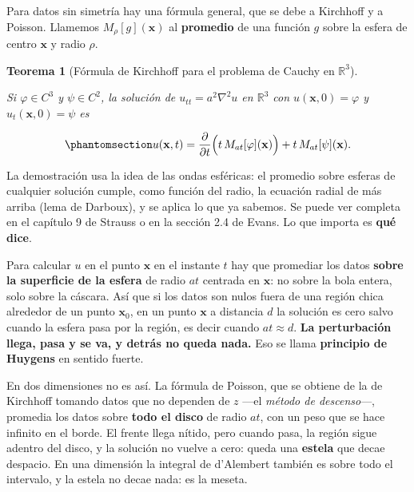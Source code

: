 \documentclass[
  spanish,
  a4paper,
]{scrbook}
\theoremstyle{definition}
\theoremstyle{plain}
\theoremstyle{definition}
\theoremstyle{plain}
\newtheorem{theorem}{Teorema}[chapter]
\theoremstyle{definition}
\theoremstyle{remark}
\begin{document}
Para datos sin simetría hay una fórmula general, que se debe a Kirchhoff
y a Poisson. Llamemos \(M_\rho[g](\mathbf x)\) al \textbf{promedio} de
una función \(g\) sobre la esfera de centro \(\mathbf x\) y radio
\(\rho\).

\begin{theorem}[Fórmula de Kirchhoff para el problema de Cauchy en
\(\mathbb R^3\)]\protect\hypertarget{thm-hip-kirchhoff-cauchy}{}\label{thm-hip-kirchhoff-cauchy}

Si \(\varphi\in C^3\) y \(\psi\in C^2\), la solución de
\(u_{tt} = a^2\nabla^2u\) en \(\mathbb R^3\) con
\(u(\mathbf x,0) = \varphi\) y \(u_t(\mathbf x,0) = \psi\) es

\begin{equation}\protect\phantomsection\label{eq-hip-kirchhoff-cauchy}{
u(\mathbf x,t) = \frac{\partial}{\partial t}\Big(t\,M_{at}[\varphi](\mathbf x)\Big) + t\,M_{at}[\psi](\mathbf x).
}\end{equation}

\end{theorem}

La demostración usa la idea de las ondas esféricas: el promedio sobre
esferas de cualquier solución cumple, como función del radio, la
ecuación radial de más arriba (lema de Darboux), y se aplica lo que ya
sabemos. Se puede ver completa en el capítulo 9 de Strauss o en la
sección 2.4 de Evans. Lo que importa es \textbf{qué dice}.

Para calcular \(u\) en el punto \(\mathbf x\) en el instante \(t\) hay
que promediar los datos \textbf{sobre la superficie de la esfera} de
radio \(at\) centrada en \(\mathbf x\): no sobre la bola entera, solo
sobre la cáscara. Así que si los datos son nulos fuera de una región
chica alrededor de un punto \(\mathbf x_0\), en un punto \(\mathbf x\) a
distancia \(d\) la solución es cero salvo cuando la esfera pasa por la
región, es decir cuando \(at\approx d\). \textbf{La perturbación llega,
pasa y se va, y detrás no queda nada.} Eso se llama \textbf{principio de
Huygens} en sentido fuerte.

En dos dimensiones no es así. La fórmula de Poisson, que se obtiene de
la de Kirchhoff tomando datos que no dependen de \(z\) ---el
\emph{método de descenso}---, promedia los datos sobre \textbf{todo el
disco} de radio \(at\), con un peso que se hace infinito en el borde. El
frente llega nítido, pero cuando pasa, la región sigue adentro del
disco, y la solución no vuelve a cero: queda una \textbf{estela} que
decae despacio. En una dimensión la integral de d'Alembert también es
sobre todo el intervalo, y la estela no decae nada: es la meseta.
\end{document}
